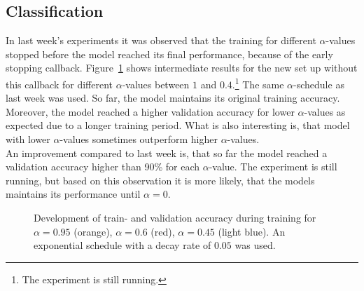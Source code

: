 \documentclass[10pt,twocolumn,letterpaper]{article}
\begin{document}
\subsection{Classification}
In last week's experiments it was observed that the training for different $\alpha$-values stopped before the model reached its final performance, because of the early stopping callback.
Figure~\ref{fig:acc_classification} shows intermediate results for the new set up without this callback for different $\alpha$-values between $1$ and $0.4$.\footnote{The experiment is still running.}
The same $\alpha$-schedule as last week was used.
So far, the model maintains its original training accuracy.
Moreover, the model reached a higher validation accuracy for lower $\alpha$-values as expected due to a longer training period.
What is also interesting is, that model with lower $\alpha$-values sometimes outperform higher $\alpha$-values.\\
An improvement compared to last week is, that so far the model reached a validation accuracy higher than 90\% for each $\alpha$-value.
The experiment is still running, but based on this observation it is more likely, that the models maintains its performance until $\alpha=0$.
\begin{figure}[hpbt]
	\centering
	\hspace{0.1\textwidth}
	\caption[]{Development of train- and validation accuracy during training for $\alpha=0.95$ (orange), $\alpha=0.6$ (red), $\alpha=0.45$ (light blue).
	An exponential schedule with a decay rate of $0.05$ was used.}
	\label{fig:acc_classification}
\end{figure}
\end{document}

